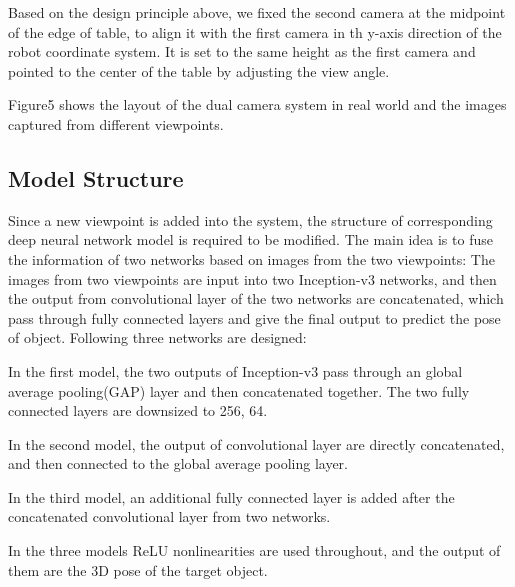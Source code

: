 Based on the design principle above, we fixed the second camera at the midpoint of the edge of table, to align it with the first camera in th y-axis direction of the robot coordinate system. It is set to the same height as the first camera and pointed to the center of the table by adjusting the view angle. 

\missingfigure{}

Figure5 shows the layout of the dual camera system in real world and the images captured from different viewpoints.

\subsection{Model Structure}
Since a new viewpoint is added into the system, the structure of corresponding deep neural network model is required to be modified. The main idea is to fuse the information of two networks based on images from the two viewpoints: The images from two viewpoints are input into two Inception-v3 networks, and then the output from convolutional layer of the two networks are concatenated,  which pass through fully connected layers and give the final output to predict the pose of object. Following three networks are designed:

\missingfigure{}
In the first model, the two outputs of Inception-v3 pass through an global average pooling(GAP) layer and then concatenated together. The two fully connected layers are downsized to 256, 64.

In the second model, the output of convolutional layer are directly concatenated, and then connected to the global average pooling layer.

In the third model, an additional fully connected layer is added after the concatenated convolutional layer from two networks.

In the three models ReLU nonlinearities are used throughout, and the output of them are the 3D pose of the target object. 

